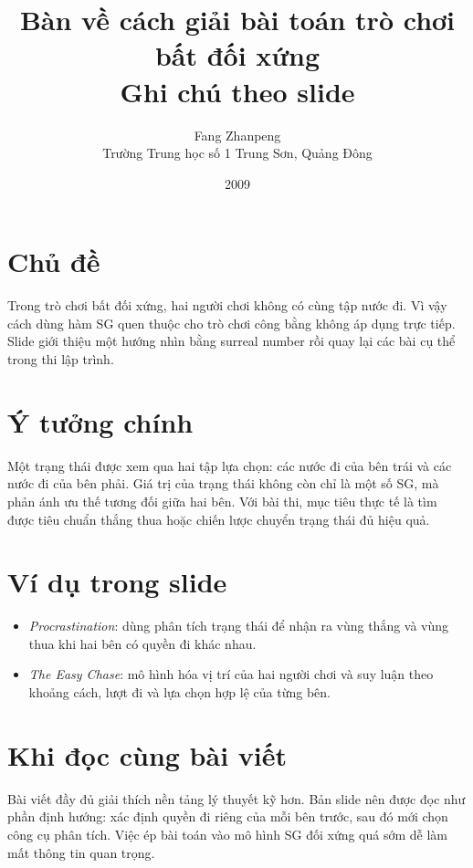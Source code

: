 \documentclass[11pt]{article}
\title{Bàn về cách giải bài toán trò chơi bất đối xứng\\{\large Ghi chú theo slide}}
\author{Fang Zhanpeng\\Trường Trung học số 1 Trung Sơn, Quảng Đông}
\date{2009}
\begin{document}
\maketitle


\section{Chủ đề}

Trong trò chơi bất đối xứng, hai người chơi không có cùng tập nước đi. Vì vậy
cách dùng hàm SG quen thuộc cho trò chơi công bằng không áp dụng trực tiếp.
Slide giới thiệu một hướng nhìn bằng surreal number rồi quay lại các bài cụ
thể trong thi lập trình.

\section{Ý tưởng chính}

Một trạng thái được xem qua hai tập lựa chọn: các nước đi của bên trái và các
nước đi của bên phải. Giá trị của trạng thái không còn chỉ là một số SG, mà
phản ánh ưu thế tương đối giữa hai bên. Với bài thi, mục tiêu thực tế là tìm
được tiêu chuẩn thắng thua hoặc chiến lược chuyển trạng thái đủ hiệu quả.

\section{Ví dụ trong slide}

\begin{itemize}
  \item \textit{Procrastination}: dùng phân tích trạng thái để nhận ra vùng
  thắng và vùng thua khi hai bên có quyền đi khác nhau.
  \item \textit{The Easy Chase}: mô hình hóa vị trí của hai người chơi và suy
  luận theo khoảng cách, lượt đi và lựa chọn hợp lệ của từng bên.
\end{itemize}

\section{Khi đọc cùng bài viết}

Bài viết đầy đủ giải thích nền tảng lý thuyết kỹ hơn. Bản slide nên được đọc
như phần định hướng: xác định quyền đi riêng của mỗi bên trước, sau đó mới
chọn công cụ phân tích. Việc ép bài toán vào mô hình SG đối xứng quá sớm dễ
làm mất thông tin quan trọng.
\end{document}

